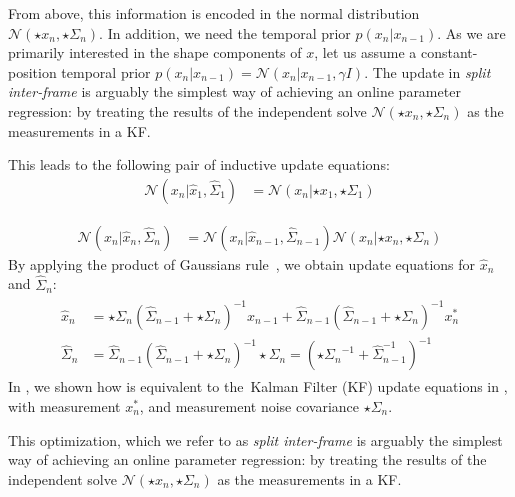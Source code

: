 \begin{DRAFT}
From above, this information is encoded in the normal distribution $\mathcal{N}(\star{x}_n, \star{\Sigma}_n)$.
% 
In addition, we need the temporal prior $p(x_n|x_{n-1})$.  As we are primarily interested in the shape components of $x$, let us assume a constant-position temporal prior $p(x_n|x_{n-1}) = \mathcal N(x_n | x_{n-1}, \gamma I)$.
% 
% 
The update in {\em split inter-frame} is arguably the simplest way of achieving an online parameter regression: by treating the results of the independent solve $\mathcal{N}(\star{x}_n, \star{\Sigma}_n)$ as the measurements in a KF.  
\end{DRAFT}
\begin{edit}
This leads to the following pair of inductive update equations:
\begin{align}
\mathcal{N}(x_n|\hat{x}_1, \hat{\Sigma}_1) &= \mathcal{N}(x_n|\star{x}_1, \star{\Sigma}_1) 
\end{align}
\end{edit}
% 
\begin{align}
\mathcal{N}(x_n | \hat{x}_n, \hat{\Sigma}_n) &= \mathcal{N}(x_n | \hat{x}_{n-1}, \hat{\Sigma}_{n-1}) \mathcal{N}(x_n |\star{x}_n, \star{\Sigma}_n)
\end{align}
By applying the product of Gaussians rule~\cite{petersen2008matrix}, we obtain update equations for $\hat{x}_n$ and $\hat{\Sigma}_n$:
% 
\begin{align}
\begin{split}
\hat{x}_{n} &= \star\Sigma_{n} (\hat{\Sigma}_{n-1} + \star\Sigma_{n})^{-1} \hat{x}_{n-1} + 
\hat{\Sigma}_{n-1} (\hat{\Sigma}_{n-1} + \star\Sigma_n)^{-1} x_n^*
\\
\hat{\Sigma}_n &= \hat{\Sigma}_{n-1} (\hat{\Sigma}_{n-1} + {\star\Sigma_n})^{-1} \star\Sigma_n = \left({\star{\Sigma}_n}^{-1} + \hat{\Sigma}_{n-1}^{-1}\right)^{-1}
\label{eq:combining}
\end{split}
\end{align}
% 
In , we shown how  is equivalent to the~Kalman Filter (KF) update equations in , with measurement $x_n^*$, and measurement noise covariance $\star\Sigma_n$. 
%
\begin{edit}This optimization, which we refer to as \emph{split inter-frame} is arguably the simplest way of achieving an online parameter regression: by treating the results of the independent solve $\mathcal{N}(\star{x}_n, \star{\Sigma}_n)$ as the measurements in a KF. \end{edit}


